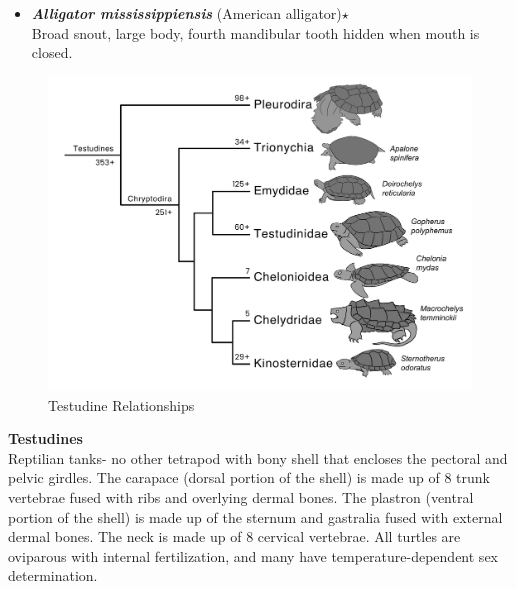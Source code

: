 \documentclass[a4paper,12pt]{article}
\begin{document}
\begin{description}
\begin{itemize}
  \item{\textbf{\textit{Alligator mississippiensis}} (American alligator)$\star$} \\ Broad snout, large body, fourth mandibular tooth hidden when mouth is closed.
\end{itemize}

\begin{figure}[H]
\centering
  \includegraphics[scale=0.4]{Testudines_tre.pdf}
  \caption{Testudine Relationships}
  \label{fig:Testudines}
\end{figure}


\item\textbf{Testudines} \\ Reptilian tanks- no other tetrapod with bony shell that encloses the pectoral and pelvic girdles. The carapace (dorsal portion of the shell) is made up of 8 trunk vertebrae fused with ribs and overlying dermal bones. The plastron (ventral portion of the shell) is made up of the sternum and gastralia fused with external dermal bones. The neck is made up of 8 cervical vertebrae. All turtles are oviparous with internal fertilization, and many have temperature-dependent sex determination.


\end{description}
\end{document}
